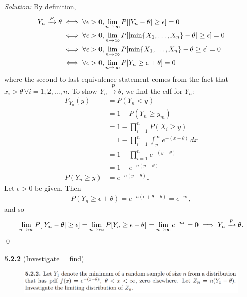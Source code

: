 \documentclass{book}
\theoremstyle{definition}
\newcommand{\nn}{\nonumber}
\begin{document}
\noindent \textit{Solution:} By definition,
\begin{align}
Y_n \xrightarrow{P} \theta &\iff \forall \epsilon > 0, \lim_{n\to \infty}P[\abs{Y_n - \theta} \geq \epsilon ] = 0\nn\\
&\iff \forall \epsilon > 0, \lim_{n\to \infty}P[\abs{\min\{ X_1,\dots,X_n\} - \theta} \geq \epsilon ] = 0\nn\\
&\iff \forall \epsilon > 0, \lim_{n\to \infty}P[\min\{ X_1,\dots,X_n\} - \theta \geq \epsilon] = 0\nn\\
&\iff \forall \epsilon > 0, \lim_{n\to \infty}P[Y_n  \geq \epsilon+\theta] = 0
\end{align}
where the second to last equivalence statement comes from the fact that $x_i > \theta\, \forall i = 1,2,\dots,n$. To show $Y_n \xrightarrow{P} \theta$, we find the cdf for $Y_n$:
\begin{align}
F_{Y_n}(y) &= P(Y_n < y)\nn\\
&= 1- P(Y_n \geq y_m)\nn\\
&= 1 - \prod^n_{i=1}P(X_i \geq y)\nn\\
&= 1 - \prod^n_{i=1}\int^\infty_{y} e^{-(x-\theta)}\,dx\nn\\
&= 1 - \prod^n_{i=1} e^{-(y - \theta)}\nn\\
&= 1 - e^{-n(y - \theta)}\nn\\
P(Y_n \geq y) &= e^{-n(y - \theta)}.
\end{align}
Let $\epsilon > 0$ be given. Then 
\begin{align}
P(Y_n \geq \epsilon+\theta) = e^{-n(\epsilon + \theta - \theta)} = e^{-n\epsilon},
\end{align}
and so 
\begin{align}
\lim_{n\to \infty}P[\abs{Y_n - \theta} \geq \epsilon ] = \lim_{n\to \infty}P[Y_n  \geq \epsilon+\theta] = \lim_{n\to \infty} e^{-n\epsilon} = 0 \implies Y_n \xrightarrow{P} \theta.
\end{align}\qed



\newpage


\noindent \textbf{5.2.2} (Investigate = find)

\begin{figure}[!htb]
	\includegraphics[scale=0.25]{522}
\end{figure}
\end{document}

